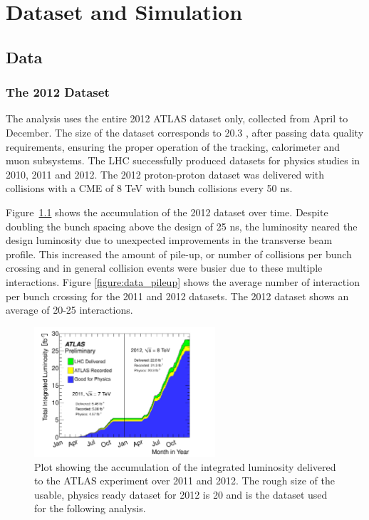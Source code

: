 \chapter[Dataset and Simulation][Dataset and Simulation]{Dataset and Simulation}
\label{chapter:data} 

\section{Data}

\subsection{The 2012 Dataset} 

The \tth analysis uses the entire 2012 ATLAS dataset only, collected
from April to December. The size of the dataset corresponds to 20.3 \ifb, after passing data quality
requirements, ensuring the proper operation of the tracking, calorimeter and muon subsystems.  
The LHC successfully produced datasets for physics studies in 2010, 2011 and 2012. The 2012 
proton-proton dataset was delivered with collisions with a CME of 8 TeV with bunch collisions
every 50 ns\cite{Aad:2013ucp}.

Figure~\ref{figure:data_lumi} shows the accumulation of the 2012 dataset over time. 
Despite doubling the bunch spacing above the design of 25 ns, the luminosity neared
the design luminosity due to unexpected improvements in the transverse beam profile\cite{Carli:1424362}. This increased
the amount of pile-up, or number of collisions per bunch crossing and in general collision
events were busier due to these multiple interactions. Figure \ref{figure:data_pileup} shows
the average number of interaction per bunch crossing for the 2011 and 2012 datasets. The 2012
dataset shows an average of 20-25 interactions. 

\begin{figure}[!t]
\centering 
\includegraphics[width=0.60\textwidth]{figs/data/intlumivstime2011-2012DQ.pdf}
\caption{ Plot showing the accumulation of the integrated luminosity delivered to the ATLAS experiment over 2011 and 2012. The rough size of the usable, physics ready dataset for 2012 is 20 \ifb and is the dataset used for the following analysis. 
}
\label{figure:data_lumi}
\end{figure}


